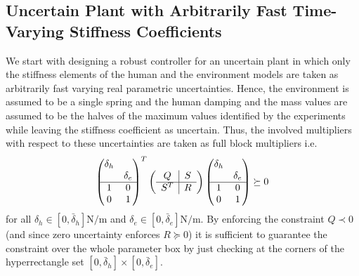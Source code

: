 \subsection{Uncertain Plant with Arbitrarily Fast Time-Varying Stiffness Coefficients}

We start with designing a robust controller for an uncertain plant in which only the stiffness elements of the
human and the environment models are taken as arbitrarily fast varying real parametric uncertainties. Hence, the environment 
is assumed to be a single spring and the human damping and the mass values are assumed to be the halves of the maximum 
values identified by the experiments while leaving the stiffness coefficient as uncertain. Thus, the involved multipliers with 
respect to these uncertainties are taken as full block multipliers i.e. 
\[
\begin{pmatrix}\delta_h &\\ &\delta_e\\\hline 1 &0\\0&1\end{pmatrix}^T
\left(
\begin{array}{c|c}
	Q &S\\\hline S^T &R
\end{array}
\right)
\begin{pmatrix}\delta_h &\\ &\delta_e\\\hline 1 &0\\0&1\end{pmatrix} \succeq 0
\]
for all $\delta_h\in[0,\bar{\delta}_h]\si{\newton\per\meter}$ and $\delta_e\in[0,\bar{\delta}_e]\si{\newton\per\meter}$. 
By enforcing the constraint $Q\prec 0$ (and since zero uncertainty enforces $R\succeq 0$) it is sufficient to guarantee the 
constraint over the whole parameter box by just checking at the corners of the hyperrectangle set $[0,\bar{\delta}_h]\times
[0,\bar{\delta}_e]$. 
\designonedata

